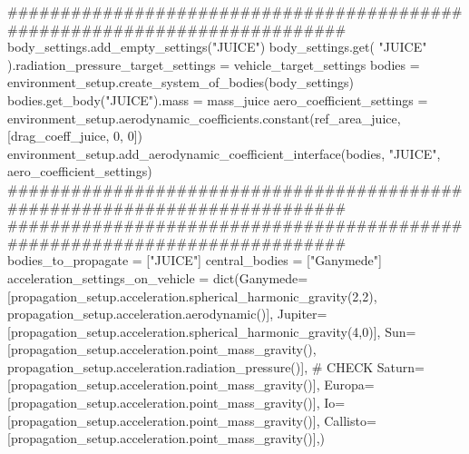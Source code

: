 \markdownRendererInterblockSeparator
{}########################################################################### body_settings.add_empty_settings("JUICE") body_settings.get( "JUICE" ).radiation_pressure_target_settings = vehicle_target_settings\markdownRendererInterblockSeparator
{}
\markdownRendererSectionEnd \markdownRendererSectionBegin
{}\markdownRendererInterblockSeparator
{}bodies = environment_setup.create_system_of_bodies(body_settings) bodies.get_body("JUICE").mass = mass_juice\markdownRendererInterblockSeparator
{}
\markdownRendererSectionEnd \markdownRendererSectionBegin
{}\markdownRendererInterblockSeparator
{}aero_coefficient_settings = environment_setup.aerodynamic_coefficients.constant(ref_area_juice, [drag_coeff_juice, 0, 0]) environment_setup.add_aerodynamic_coefficient_interface(bodies, "JUICE", aero_coefficient_settings)\markdownRendererInterblockSeparator
{}###########################################################################\markdownRendererInterblockSeparator
{}
\markdownRendererSectionEnd \markdownRendererSectionBegin
{}\markdownRendererInterblockSeparator
{}###########################################################################\markdownRendererInterblockSeparator
{}
\markdownRendererSectionEnd \markdownRendererSectionBegin
{}\markdownRendererInterblockSeparator
{}bodies_to_propagate = ["JUICE"] central_bodies = ["Ganymede"]\markdownRendererInterblockSeparator
{}
\markdownRendererSectionEnd \markdownRendererSectionBegin
{}\markdownRendererInterblockSeparator
{}acceleration_settings_on_vehicle = dict(Ganymede=[propagation_setup.acceleration.spherical_harmonic_gravity(2,2), propagation_setup.acceleration.aerodynamic()], Jupiter=[propagation_setup.acceleration.spherical_harmonic_gravity(4,0)], Sun=[propagation_setup.acceleration.point_mass_gravity(), propagation_setup.acceleration.radiation_pressure()], # CHECK Saturn=[propagation_setup.acceleration.point_mass_gravity()], Europa=[propagation_setup.acceleration.point_mass_gravity()], Io=[propagation_setup.acceleration.point_mass_gravity()], Callisto=[propagation_setup.acceleration.point_mass_gravity()],)\markdownRendererInterblockSeparator
{}
\markdownRendererSectionEnd \markdownRendererSectionBegin
{}\markdownRendererInterblockSeparator
